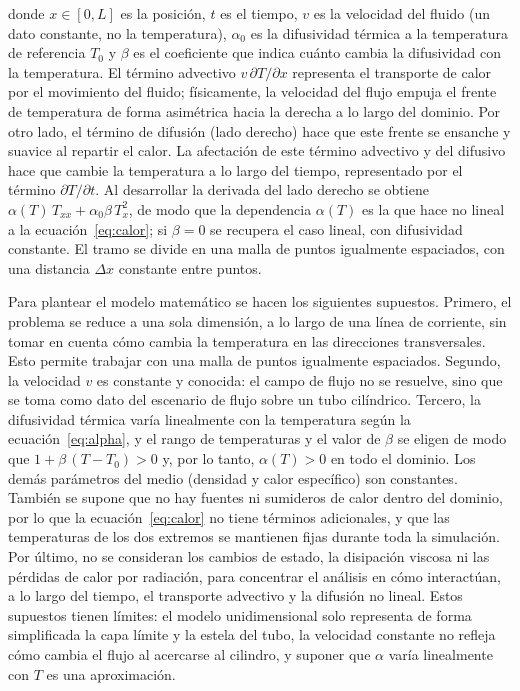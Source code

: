 \documentclass[final,5p,times,twocolumn,authoryear,11pt]{elsarticle}
\begin{document}
\noindent donde $x \in [0,L]$ es la posición, $t$ es el tiempo, $v$ es la velocidad del fluido (un dato constante, no la temperatura), $\alpha_0$ es la difusividad térmica a la temperatura de referencia $T_0$ y $\beta$ es el coeficiente que indica cuánto cambia la difusividad con la temperatura. El término advectivo $v\,\partial T/\partial x$ representa el transporte de calor por el movimiento del fluido; físicamente, la velocidad del flujo empuja el frente de temperatura de forma asimétrica hacia la derecha a lo largo del dominio. Por otro lado, el término de difusión (lado derecho) hace que este frente se ensanche y suavice al repartir el calor. La afectación de este término advectivo y del difusivo hace que cambie la temperatura a lo largo del tiempo, representado por el término $\partial T/\partial t$. Al desarrollar la derivada del lado derecho se obtiene $\alpha(T)\,T_{xx} + \alpha_0\beta\,T_x^{2}$, de modo que la dependencia $\alpha(T)$ es la que hace no lineal a la ecuación~\eqref{eq:calor}; si $\beta=0$ se recupera el caso lineal, con difusividad constante. El tramo se divide en una malla de puntos igualmente espaciados, con una distancia $\Delta x$ constante entre puntos.


Para plantear el modelo matemático se hacen los siguientes supuestos. Primero, el problema se reduce a una sola dimensión, a lo largo de una línea de corriente, sin tomar en cuenta cómo cambia la temperatura en las direcciones transversales. Esto permite trabajar con una malla de puntos igualmente espaciados. Segundo, la velocidad $v$ es constante y conocida: el campo de flujo no se resuelve, sino que se toma como dato del escenario de flujo sobre un tubo cilíndrico. Tercero, la difusividad térmica varía linealmente con la temperatura según la ecuación~\eqref{eq:alpha}, y el rango de temperaturas y el valor de $\beta$ se eligen de modo que $1+\beta\,(T-T_0)>0$ y, por lo tanto, $\alpha(T)>0$ en todo el dominio. Los demás parámetros del medio (densidad y calor específico) son constantes. También se supone que no hay fuentes ni sumideros de calor dentro del dominio, por lo que la ecuación~\eqref{eq:calor} no tiene términos adicionales, y que las temperaturas de los dos extremos se mantienen fijas durante toda la simulación. Por último, no se consideran los cambios de estado, la disipación viscosa ni las pérdidas de calor por radiación, para concentrar el análisis en cómo interactúan, a lo largo del tiempo, el transporte advectivo y la difusión no lineal. Estos supuestos tienen límites: el modelo unidimensional solo representa de forma simplificada la capa límite y la estela del tubo, la velocidad constante no refleja cómo cambia el flujo al acercarse al cilindro, y suponer que $\alpha$ varía linealmente con $T$ es una aproximación.
\end{document}
